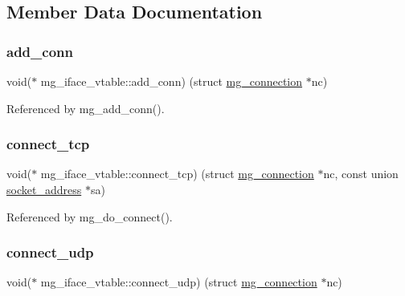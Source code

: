 \subsection{Member Data Documentation}
\mbox{\label{structmg__iface__vtable_a1b09df656c627c217c4f8efebef85a1e_a1b09df656c627c217c4f8efebef85a1e}} 
\subsubsection{\texorpdfstring{add\+\_\+conn}{add\_conn}}
{\footnotesize\ttfamily void($\ast$ mg\+\_\+iface\+\_\+vtable\+::add\+\_\+conn) (struct \hyperlink{structmg__connection}{mg\+\_\+connection} $\ast$nc)}



Referenced by mg\+\_\+add\+\_\+conn().

\mbox{\label{structmg__iface__vtable_a9dfae9823c533b3a3cf22501f7794f0a_a9dfae9823c533b3a3cf22501f7794f0a}} 
\subsubsection{\texorpdfstring{connect\+\_\+tcp}{connect\_tcp}}
{\footnotesize\ttfamily void($\ast$ mg\+\_\+iface\+\_\+vtable\+::connect\+\_\+tcp) (struct \hyperlink{structmg__connection}{mg\+\_\+connection} $\ast$nc, const union \hyperlink{unionsocket__address}{socket\+\_\+address} $\ast$sa)}



Referenced by mg\+\_\+do\+\_\+connect().

\mbox{\label{structmg__iface__vtable_a254b3a4b9c6d71ad2e28b634938ff039_a254b3a4b9c6d71ad2e28b634938ff039}} 
\subsubsection{\texorpdfstring{connect\+\_\+udp}{connect\_udp}}
{\footnotesize\ttfamily void($\ast$ mg\+\_\+iface\+\_\+vtable\+::connect\+\_\+udp) (struct \hyperlink{structmg__connection}{mg\+\_\+connection} $\ast$nc)}



